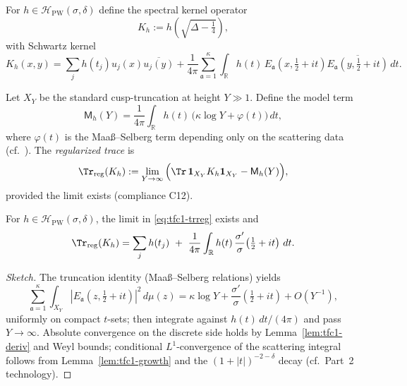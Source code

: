 \begin{definition}\relax\hspace{0pt}
\label{def:tfc1-kernel} %
For $h\in\mathcal{H}_{\mathrm{PW}}(\sigma,\delta)$ define the spectral kernel operator
\[
K_h:=h\!\left(\sqrt{\Delta-\tfrac14}\right),
\]
with Schwartz kernel
\[
K_h(x,y)=\sum_{j}h(t_j)u_j(x)\overline{u_j(y)}+\frac{1}{4\pi}\sum_{\mathfrak{a}=1}^{\kappa}\int_{\mathbb{R}}h(t)\,E_{\mathfrak{a}}(x,\tfrac12+it)\overline{E_{\mathfrak{a}}(y,\tfrac12+it)}\,dt.
\]
\end{definition}

\begin{definition}\relax\hspace{0pt}
\label{def:tfc1-trunc} %
Let $X_Y$ be the standard cusp-truncation at height $Y\gg1$. Define the model term
\[
\mathsf{M}_h(Y)=\frac{1}{4\pi}\int_{\mathbb{R}}h(t)\,\Big(\kappa\log Y+\varphi(t)\Big)\,dt,
\]
where $\varphi(t)$ is the Maaß--Selberg term depending only on the scattering data (cf.\ \cite[Ch.~3]{HejhalII}). The \emph{regularized trace} is
\begin{equation}\relax\hspace{0pt}
\label{eq:tfc1-trreg}\relax\hspace{0pt}
\Tr_{\mathrm{reg}}(K_h):=\lim_{Y\to\infty}\Big(\Tr\,\mathbf{1}_{X_Y}K_h\mathbf{1}_{X_Y}-\mathsf{M}_h(Y)\Big),
\end{equation}
provided the limit exists (compliance C12).\relax\hspace{0pt}
\end{definition}

\begin{proposition}\relax\hspace{0pt}
\label{prop:tfc1-existence} %
For $h\in\mathcal{H}_{\mathrm{PW}}(\sigma,\delta)$, the limit in \eqref{eq:tfc1-trreg} exists and
\[
\Tr_{\mathrm{reg}}(K_h)=\sum_{j}h(t_j)\ +\ \frac{1}{4\pi}\int_{\mathbb{R}}h(t)\,\frac{\sigma'}{\sigma}\!\left(\tfrac12+it\right)\,dt.
\]
\end{proposition}

\begin{proof}[Sketch]\relax\hspace{0pt}
The truncation identity (Maaß--Selberg relations) yields
\[
\sum_{\mathfrak{a}=1}^{\kappa}\int_{X_Y}\!\!\!|E_{\mathfrak{a}}(z,\tfrac12+it)|^2\,d\mu(z)=\kappa\log Y+\frac{\sigma'}{\sigma}(\tfrac12+it)+O(Y^{-1}),
\]
uniformly on compact $t$-sets; then integrate against $h(t)\,dt/(4\pi)$ and pass $Y\to\infty$. Absolute convergence on the discrete side holds by Lemma~\ref{lem:tfc1-deriv} and Weyl bounds; conditional $L^1$-convergence of the scattering integral follows from Lemma~\ref{lem:tfc1-growth} and the $(1+|t|)^{-2-\delta}$ decay (cf.\ Part~2 technology).\relax\hspace{0pt}
\end{proof}

